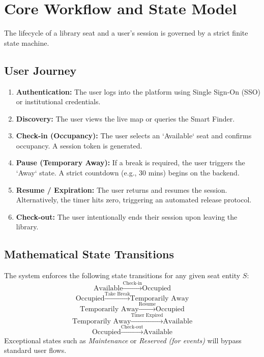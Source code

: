 \documentclass[11pt,a4paper]{article}
\begin{document}
\section{Core Workflow and State Model}
The lifecycle of a library seat and a user's session is governed by a strict finite state machine.

\subsection{User Journey}
\begin{enumerate}[leftmargin=0.7cm]
    \item \textbf{Authentication:} The user logs into the platform using Single Sign-On (SSO) or institutional credentials.
    \item \textbf{Discovery:} The user views the live map or queries the Smart Finder.
    \item \textbf{Check-in (Occupancy):} The user selects an `Available` seat and confirms occupancy. A session token is generated.
    \item \textbf{Pause (Temporary Away):} If a break is required, the user triggers the `Away` state. A strict countdown (e.g., 30 mins) begins on the backend.
    \item \textbf{Resume / Expiration:} The user returns and resumes the session. Alternatively, the timer hits zero, triggering an automated release protocol.
    \item \textbf{Check-out:} The user intentionally ends their session upon leaving the library.
\end{enumerate}

\subsection{Mathematical State Transitions}
The system enforces the following state transitions for any given seat entity $S$:
\[
\text{Available} \xrightarrow{\text{Check-in}} \text{Occupied}
\]
\[
\text{Occupied} \xrightarrow{\text{Take Break}} \text{Temporarily Away}
\]
\[
\text{Temporarily Away} \xrightarrow{\text{Resume}} \text{Occupied}
\]
\[
\text{Temporarily Away} \xrightarrow{\text{Timer Expired}} \text{Available}
\]
\[
\text{Occupied} \xrightarrow{\text{Check-out}} \text{Available}
\]
Exceptional states such as \textit{Maintenance} or \textit{Reserved (for events)} will bypass standard user flows.
\end{document}

